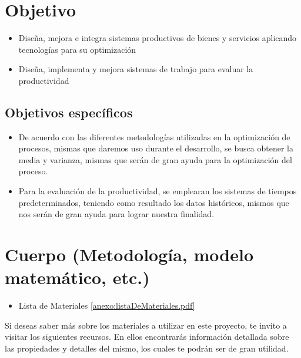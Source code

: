     
    \section{Objetivo}
    
        \begin{itemize}
            \item Diseña, mejora e integra sistemas productivos de bienes y servicios aplicando tecnologías para su optimización
            \item Diseña, implementa y mejora sistemas de trabajo para evaluar la productividad
        \end{itemize}
        
        \subsection{Objetivos específicos }
        
        \begin{itemize}
            \item De acuerdo con las diferentes metodologías utilizadas en la optimización de procesos, mismas que daremos uso durante el desarrollo, se busca obtener la media y varianza, mismas que serán de gran ayuda para la optimización del proceso. 
            \item Para la evaluación de la productividad, se emplearan los sistemas de tiempos predeterminados, teniendo como resultado los datos históricos, mismos que nos serán de gran ayuda para lograr nuestra finalidad.   
        \end{itemize}
        

    
    
    \section{Cuerpo (Metodología, modelo matemático, etc.)}
    
        \begin{itemize}
            \item Lista de Materiales 
            \ref{anexo:listaDeMateriales.pdf}
        \end{itemize}

        Si deseas saber más sobre los materiales a utilizar en este proyecto, te invito a visitar los siguientes recursos. En ellos encontrarás información detallada sobre las propiedades y detalles del mismo, los cuales te podrán ser de gran utilidad. 
        
